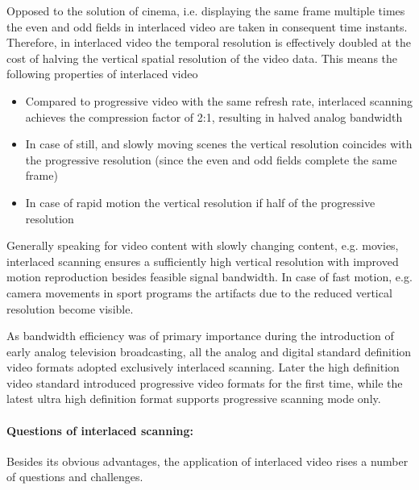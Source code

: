 Opposed to the solution of cinema, i.e. displaying the same frame multiple times the even and odd fields in interlaced video are taken in consequent time instants.
Therefore, in interlaced video the temporal resolution is effectively doubled at the cost of halving the vertical spatial resolution of the video data.
This means the following properties of interlaced video
\begin{itemize}
\item Compared to progressive video with the same refresh rate, interlaced scanning achieves the compression factor of 2:1, resulting in halved analog bandwidth
\item In case of still, and slowly moving scenes the vertical resolution coincides with the progressive resolution (since the even and odd fields complete the same frame)
\item In case of rapid motion the vertical resolution if half of the progressive resolution
\end{itemize}
Generally speaking for video content with slowly changing content, e.g. movies, interlaced scanning ensures a sufficiently high vertical resolution with improved motion reproduction besides feasible signal bandwidth.
In case of fast motion, e.g. camera movements in sport programs the artifacts due to the reduced vertical resolution become visible.
\vspace{3mm}

As bandwidth efficiency was of primary importance during the introduction of early analog television broadcasting, all the analog and digital standard definition video formats adopted exclusively interlaced scanning.
Later the high definition video standard introduced progressive video formats for the first time, while the latest ultra high definition format supports progressive scanning mode only.

\vspace{3mm}
\paragraph{Questions of interlaced scanning:}
Besides its obvious advantages, the application of interlaced video rises a number of questions and challenges.

